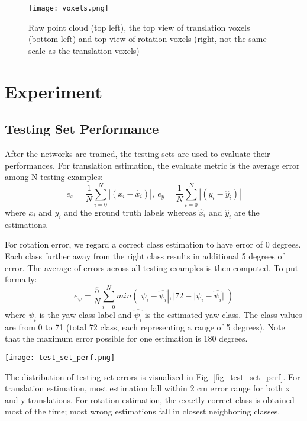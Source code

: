 \documentclass[conference]{IEEEtran}
\begin{document}
\begin{figure}[htbp]
 \centerline{\texttt{[image: voxels.png]}}
 \caption{Raw point cloud (top left), the top view of translation voxels (bottom left) and top view of rotation voxels (right, not the same scale as the translation voxels)}
 \label{fig_voxels}
\end{figure}


\section{Experiment}
\subsection{Testing Set Performance}
After the networks are trained, the testing sets are used to evaluate their performances. For translation estimation, the evaluate metric is the average error among N testing examples:
$$e_{x} = \frac{1}{N}\sum_{i=0}^{N}|(x_{i} - \hat{x}_{i})|,\
  e_{y} = \frac{1}{N}\sum_{i=0}^{N}|(y_{i} - \hat{y}_{i})|$$
where $x_{i}$ and $y_{i}$ and the ground truth labels whereas $\hat{x}_{i}$ and $\hat{y}_{i}$ are the estimations. 

For rotation error, we regard a correct class estimation to have error of 0 degrees. Each class further away from the right class results in additional 5 degrees of error. The average of errors across all testing examples is then computed. To put formally:
$$e_{\psi} = \frac{5}{N}\sum_{i=0}^{N}min(
|\psi_{i} - \hat{\psi_{i}}|, 
|72 - |\psi_{i} - \hat{\psi_{i}}||)$$
where $\psi_{i}$ is the yaw class label and $\hat{\psi_{i}}$ is the estimated yaw class. The class values are from 0 to 71 (total 72 class, each representing a range of 5 degrees). Note that the maximum error possible for one estimation is 180 degrees. 

\begin{figure*}[t]
  \texttt{[image: test\_set\_perf.png]}
  \caption{Testing Set Performance}
  \label{fig_test_set_perf}
\end{figure*}
The distribution of testing set errors is visualized in Fig. \ref{fig_test_set_perf}. For translation estimation, most estimation fall within 2 cm error range for both x and y translations. For rotation estimation, the exactly correct class is obtained most of the time; most wrong estimations fall in closest neighboring classes.
\end{document}
